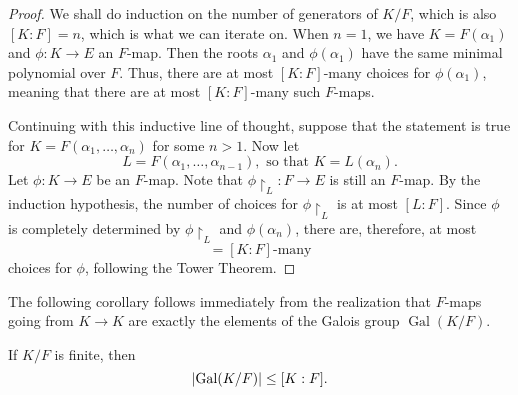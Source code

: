\documentclass[notoc,notitlepage]{tufte-book}
\DeclareMathOperator{\Gal}{Gal}
\begin{document}
\begin{proof}
  We shall do induction on the number of generators of $K / F$, which is also
  $[ K : F ] = n$, which is what we can iterate on. When $n = 1$, we have $K =
  F(\alpha_1)$ and $\phi : K \to E$ an $F$-map. Then the roots $\alpha_1$ and
  $\phi(\alpha_1)$ have the same minimal polynomial 
  over $F$. Thus, there are at most $[ K : F ]$-many choices for
  $\phi(\alpha_1)$, meaning that there are at most $[ K : F ]$-many such
  $F$-maps.

  Continuing with this inductive line of thought, suppose that the statement is
  true for $K = F(\alpha_1, \ldots, \alpha_n)$ for some $n > 1$. Now let
  \begin{equation*}
    L = F(\alpha_1, \ldots, \alpha_{n - 1}), \text{ so that } K = L(\alpha_n).
  \end{equation*}
  Let $\phi : K \to E$ be an $F$-map. Note that $\phi \restriction_L : F \to E$
  is still an $F$-map. By the induction hypothesis, the number of choices for
  $\phi \restriction_L$ is at most $[ L : F ]$. Since $\phi$ is completely
  determined by $\phi \restriction_L$ and $\phi(\alpha_n)$, there are,
  therefore, at most
  \begin{equation*}
    [L : F][ L(\alpha_n) : L ] = [ K : F ]\text{-many}
  \end{equation*}
  choices for $\phi$, following the Tower Theorem.
\end{proof}

The following corollary follows immediately from the realization that $F$-maps
going from $K \to K$ are exactly the elements of the Galois group $\Gal(K / F)$.

\begin{crly}\label{crly:upper_bound_for_the_galois_group_of_finite_extensions}
  If $K / F$ is finite, then
  \begin{equation*}
    \abs{ \Gal(K / F) } \leq [ K : F ].
  \end{equation*}
\end{crly}
\end{document}
